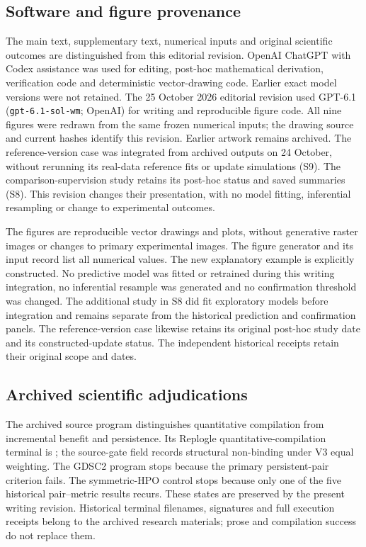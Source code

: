 \documentclass[11pt]{article}
\begin{document}
\subsection{Software and figure provenance}
The main text, supplementary text, numerical inputs and original scientific outcomes are distinguished from this editorial revision. OpenAI ChatGPT with Codex assistance was used for editing, post-hoc mathematical derivation, verification code and deterministic vector-drawing code. Earlier exact model versions were not retained. The 25 October 2026 editorial revision used GPT-6.1 (\texttt{gpt-6.1-sol-wm}; OpenAI) for writing and reproducible figure code. All nine figures were redrawn from the same frozen numerical inputs; the drawing source and current hashes identify this revision. Earlier artwork remains archived. The reference-version case was integrated from archived outputs on 24 October, without rerunning its real-data reference fits or update simulations (S9). The comparison-supervision study retains its post-hoc status and saved summaries (S8). This revision changes their presentation, with no model fitting, inferential resampling or change to experimental outcomes.

The figures are reproducible vector drawings and plots, without generative raster images or changes to primary experimental images. The figure generator and its input record list all numerical values. The new explanatory example is explicitly constructed. No predictive model was fitted or retrained during this writing integration, no inferential resample was generated and no confirmation threshold was changed. The additional study in S8 did fit exploratory models before integration and remains separate from the historical prediction and confirmation panels. The reference-version case likewise retains its original post-hoc study date and its constructed-update status. The independent historical receipts retain their original scope and dates.



\subsection{Archived scientific adjudications}
The archived source program distinguishes quantitative compilation from incremental benefit and persistence. Its Replogle quantitative-compilation terminal is \texttt{}; the source-gate field records structural non-binding under V3 equal weighting. The GDSC2 program stops because the primary persistent-pair criterion fails. The symmetric-HPO control stops because only one of the five historical pair--metric results recurs. These states are preserved by the present writing revision. Historical terminal filenames, signatures and full execution receipts belong to the archived research materials; prose and compilation success do not replace them.
\end{document}
